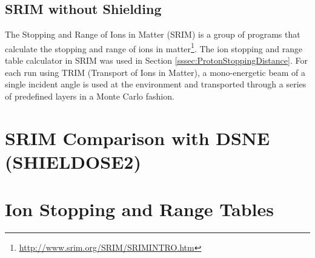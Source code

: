 \documentclass{hitec}
\begin{document}
\subsection{SRIM without Shielding}\label{ssec:SRIMnoShielding}

The Stopping and Range of Ions in Matter (SRIM) \citep{ziegler2009srim} is a group of programs that calculate the stopping and range of ions in matter\footnote{\url{http://www.srim.org/SRIM/SRIMINTRO.htm}}. The ion stopping and range table calculator in SRIM was used in Section \ref{sssec:ProtonStoppingDistance}. For each run using TRIM (Transport of Ions in Matter), a mono-energetic beam of a single incident angle is used at the environment and transported through a series of predefined layers in a Monte Carlo fashion.


\section{SRIM Comparison with DSNE (SHIELDOSE2)}


\appendix
{}
\section{Ion Stopping and Range Tables}
\label{asec:IonStoppingRangeTables}








\end{document}
